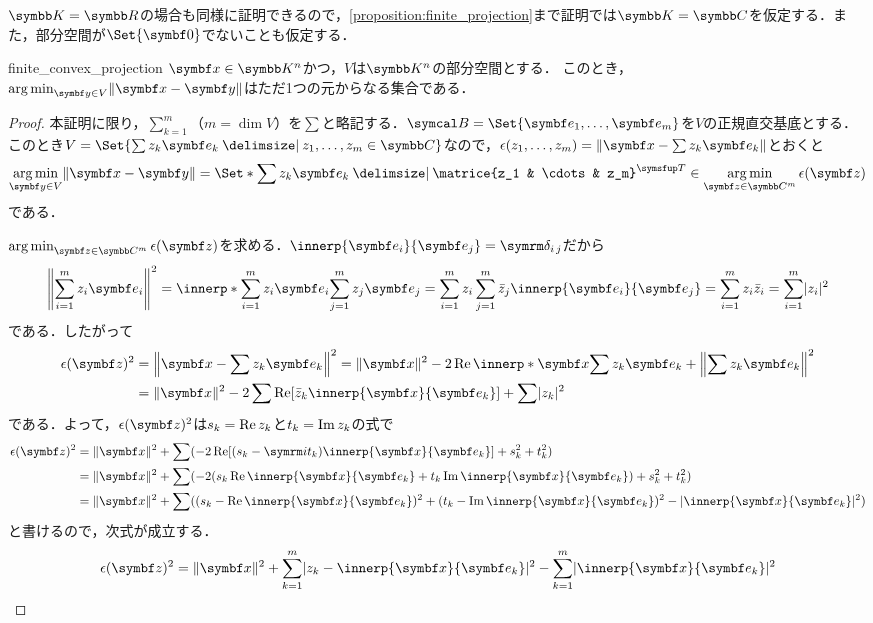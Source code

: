 \documentclass[../../main]{subfiles}
\begin{document}
\(\numset{K}=\numset{R}\)の場合も同様に証明できるので，\cref{proposition:finite_projection}まで証明では\(\numset{K}=\numset{C}\)を仮定する．また，部分空間が\(\Set{\zvec}\)でないことも仮定する．

\begin{proposition}{}{finite_convex_projection}
  \(\vect{x}\in\numset{K}^n\)かつ，\(V\)は\(\numset{K}^n\)の部分空間とする．
  このとき，\(\argmin_{\vect{y}\in V}\vnorm{\vect{x}-\vect{y}}\)はただ1つの元からなる集合である．
\end{proposition}

\begin{proof}
  本証明に限り，\(\sum_{k=1}^m\)（\(m=\dim V\)）を\(\sum\)と略記する．\(\basis{B}=\Set{\vect{e}_1,\dots,\vect{e}_m}\)を\(V\)の正規直交基底とする．
  このとき\(V=\Set{\sum z_k\vect{e}_k\given z_1,\dots,z_m\in\numset{C}}\)なので，\(\epsilon(z_1,\dots,z_m)=\vnorm{\vect{x}-\sum z_k\vect{e}_k}\)とおくと
  \[
    \argmin_{\vect{y}\in V}\vnorm{\vect{x}-\vect{y}} = \Set*{\sum z_k\vect{e}_k\given\trps{\matrice{z_1 & \cdots & z_m}}\in\argmin_{\vect{z}\in\numset{C}^m}\epsilon(\vect{z})}
  \]
  である．

  \(\argmin_{\vect{z}\in\numset{C}^m}\epsilon(\vect{z})\)を求める．\(\innerp{\vect{e}_i}{\vect{e}_j}=\kdelta{i}{j}\)だから
  \[
    \vnorm*{\sum_{i=1}^mz_i\vect{e}_i}^2 = \innerp*{\sum_{i=1}^mz_i\vect{e}_i}{\sum_{j=1}^mz_j\vect{e}_j}
    = \sum_{i=1}^mz_i\sum_{j=1}^m\conj{z}_j\innerp{\vect{e}_i}{\vect{e}_j}
    = \sum_{i=1}^mz_i\conj{z}_i
    = \sum_{i=1}^m\abs{z_i}^2
  \]
  である．したがって
  \begin{align*}
    \epsilon(\vect{z})^2 &= \vnorm*{\vect{x}-\sum z_k\vect{e}_k}^2 = \vnorm{\vect{x}}^2-2\rpart\innerp*{\vect{x}}{\sum z_k\vect{e}_k}+\vnorm*{\sum z_k\vect{e}_k}^2 \\
    &= \vnorm{\vect{x}}^2-2\sum\rpart[\conj{z}_k\innerp{\vect{x}}{\vect{e}_k}]+\sum\abs{z_k}^2
  \end{align*}
  である．よって，\(\epsilon(\vect{z})^2\)は\(s_k=\operatorname{Re} z_k\)と\(t_k=\operatorname{Im} z_k\)の式で
  \begin{align*}
    \epsilon(\vect{z})^2 &= \vnorm{\vect{x}}^2+\sum(-2\rpart[(s_k-\iuni t_k)\innerp{\vect{x}}{\vect{e}_k}]+s_k^2+t_k^2) \\
    &= \vnorm{\vect{x}}^2+\sum(-2(s_k\rpart\innerp{\vect{x}}{\vect{e}_k}+t_k\ipart\innerp{\vect{x}}{\vect{e}_k})+s_k^2+t_k^2) \\
    &= \vnorm{\vect{x}}^2+\sum((s_k-\rpart\innerp{\vect{x}}{\vect{e}_k})^2+(t_k-\ipart\innerp{\vect{x}}{\vect{e}_k})^2-\abs{\innerp{\vect{x}}{\vect{e}_k}}^2)
  \end{align*}
  と書けるので，次式が成立する．
  \begin{equation}
    \label{equation:pre_bessels_inequality}
    \epsilon(\vect{z})^2 = \vnorm{\vect{x}}^2+\sum_{k=1}^m\abs{z_k-\innerp{\vect{x}}{\vect{e}_k}}^2-\sum_{k=1}^m\abs{\innerp{\vect{x}}{\vect{e}_k}}^2
  \end{equation}


\end{proof}
\end{document}
